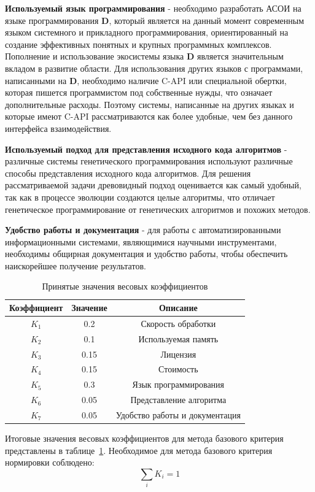 \documentclass[russian,utf8,emptystyle]{eskdtext}
\begin{document}
\begin{spacing}{1.5}
\textbf{Используемый язык программирования} - необходимо разработать АСОИ на языке программирования \textbf{D}, который является на данный момент современным языком системного и прикладного программирования, ориентированный на создание эффективных понятных и крупных программных комплексов. Пополнение и использование экосистемы языка \textbf{D} является значительным вкладом в развитие области. Для использования других языков с программами, написанными на \textbf{D}, необходимо наличие C-API или специальной обертки, которая пишется программистом под собственные нужды, что означает дополнительные расходы. Поэтому системы, написанные на других языках и которые имеют C-API рассматриваются как более удобные, чем без данного интерфейса взаимодействия.

\textbf{Используемый подход для представления исходного кода алгоритмов} - различные системы генетического программирования используют различные способы представления исходного кода алгоритмов. Для решения рассматриваемой задачи древовидный подход оценивается как самый удобный, так как в процессе эволюции создаются целые алгоритмы, что отличает генетическое программирование от генетических алгоритмов и похожих методов.

\textbf{Удобство работы и документация} - для работы с автоматизированными информационными системами, являющимися научными инструментами, необходимы общирная документация и удобство работы, чтобы обеспечить наискорейшее получение результатов. 

\begin{table}
\centering
\caption{Принятые значения весовых коэффициентов}
\label{tab:quality_koeff}
\begin{tabular}{c|c|c}
Коэффициент & Значение & Описание \\ 
\hline 
$K_1$ & 0.2 & Скорость обработки \\ 
\hline 
$K_2$ & 0.1 & Используемая память \\ 
\hline 
$K_3$ & 0.15 & Лицензия \\ 
\hline 
$K_4$ & 0.15 & Стоимость \\ 
\hline 
$K_5$ & 0.3 & Язык программирования \\ 
\hline 
$K_6$ & 0.05 & Представление алгоритма \\ 
\hline 
$K_7$ & 0.05 & Удобство работы и документация 
\end{tabular} 
\end{table}

Итоговые значения весовых коэффициентов для метода базового критерия представлены в таблице~\ref{tab:quality_koeff}. Необходимое для метода базового критерия нормировки соблюдено:
$$
\sum_i K_i = 1
$$


\end{spacing}
\end{document}
